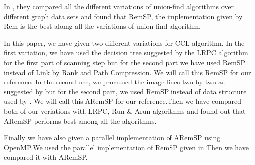 In \cite{Patwary2010_RemSP}, they compared all the different variations of union-find algorithms over different graph data sets and found that RemSP, the implementation given by Rem is the best alomg all the variations of union-find algorithm.

In this paper, we have given two different variations for CCL algorithm. In the first variation, we have used the decision tree suggested by the LRPC algorithm for the first part of scanning step but for the second part we have used RemSP instead of Link by Rank and Path Compression. We will call this RemSP for our reference.
In the second one, we processed the image lines two by two as suggested by \cite{He2012_ARun} but for the second part, we used RemSP instead of data structure used by \cite{He2012_ARun}. We will call this ARemSP for our reference.Then we have compared both of our veriations with LRPC, Run & Arun algorithms and found out that ARemSP performs best among all the algorithms.

Finally we have also given a parallel implementation of ARemSP using OpenMP.We used the parallel implementation of RemSP given in \cite{Patwary2012_PARemSP} Then we have compared it with ARemSP.
